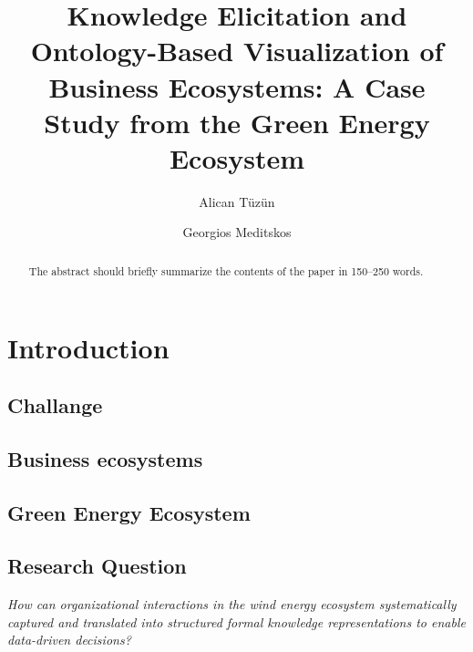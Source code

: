 \documentclass[runningheads]{llncs}
\begin{document}
%
\title{Knowledge Elicitation and Ontology-Based Visualization of Business Ecosystems: A Case Study from the 
Green Energy Ecosystem}
%
%
\author{Alican Tüzün \and
Georgios Meditskos
}
%
%
%
\maketitle              %
%
\begin{abstract}
The abstract should briefly summarize the contents of the paper in
150--250 words.

\end{abstract}
%
%
%
\section{Introduction}

\subsection{Challange}
\subsection{Business ecosystems}
\subsection{Green Energy Ecosystem}
\subsection{Research Question}
\begin{center}
\textit{How can organizational interactions in the wind energy ecosystem 
systematically captured and translated into structured formal knowledge representations to enable data-driven decisions?}
\end{center}
\end{document}
